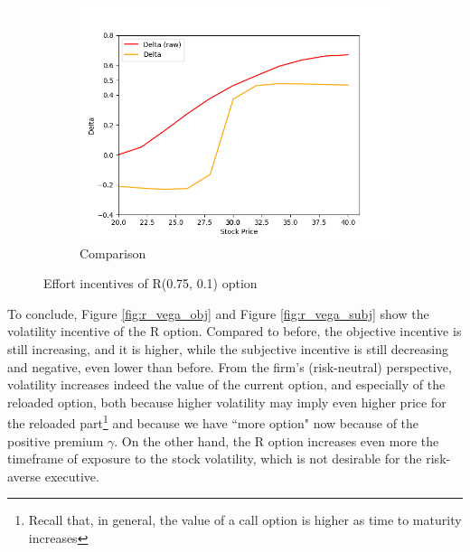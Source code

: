 \begin{figure}[H]
\begin{subfigure}{0.32\textwidth}
        \centering
        \includegraphics[width=\textwidth]{fig/4/r_delta_comp.png}
        \caption{Comparison}
        \label{fig:r_delta_comp}
    \end{subfigure}
    \caption{Effort incentives of R(0.75, 0.1) option}
    \label{fig:r_delta_both}
\end{figure}
\vspace*{15pt}

To conclude, Figure \ref*{fig:r_vega_obj} and Figure \ref*{fig:r_vega_subj} show the volatility incentive of the R option. Compared to before, the objective incentive is still increasing, and it is higher, while the subjective incentive is still decreasing and negative, even lower than before. From the firm's (risk-neutral) perspective, volatility increases indeed the value of the current option, and especially of the reloaded option, both because higher volatility may imply even higher price for the reloaded part\footnote{Recall that, in general, the value of a call option is higher as time to maturity increases} and because we have ``more option" now because of the positive premium $\gamma$. On the other hand, the R option increases even more the timeframe of exposure to the stock volatility, which is not desirable for the risk-averse executive.

